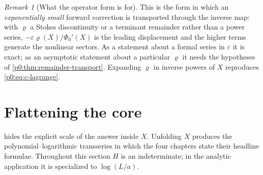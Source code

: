 \documentclass[11pt,a4paper,oneside]{book}
\theoremstyle{plain}
\theoremstyle{definition}
\theoremstyle{remark}
\newtheorem{remark}[theorem]{Remark}
\begin{document}
\begin{remark}[What the operator form is for]\label{p0:rem:operator}
This is the form in which an \emph{exponentially small} forward correction is
transported through the inverse map: with $\varrho$ a Stokes discontinuity or a
terminant remainder rather than a power series, $-\varepsilon\varrho(X)/\Phi_0'(X)$
is the leading displacement and the higher terms generate the nonlinear sectors.
As a statement about a formal series in $\varepsilon$ it is exact; as an
asymptotic statement about a particular $\varrho$ it needs the hypotheses of
\cref{p0:thm:remainder-transport}.  Expanding $\varrho$ in inverse powers of $X$
reproduces \eqref{p0:eq:c-lagrange}.
\end{remark}

\section{Flattening the core}\label{p0:sec:flattening}

 hides the explicit scale of the answer inside
$X$.  Unfolding $X$ produces the polynomial--logarithmic transseries in which
the four chapters state their headline formulae.  Throughout this section $H$
is an indeterminate; in the analytic application it is specialized to
$\log(L/a)$.
\end{document}
